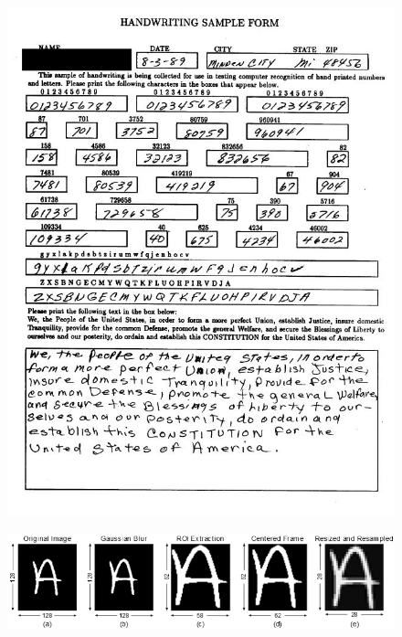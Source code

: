 \documentclass[12pt, spanish]{article}
\begin{document}
\begin{figure}
\centering
\begin{minipage}{.5\textwidth}
  \centering
  \includegraphics[width=1\linewidth]{images/nist1.jpg}
  \label{fig:nist1}
\end{minipage}%
\begin{minipage}{.5\textwidth}
  \centering
  \includegraphics[width=1\linewidth]{images/emnist1.png}
  \label{fig:emnist1}
\end{minipage}
\end{figure}
\end{document}
